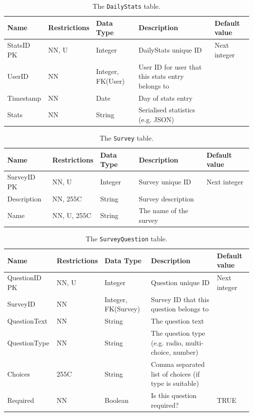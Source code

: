 \documentclass[a4paper, 11pt, titlepage]{article}
\begin{document}
\begin{table}[H]
  \centering
  \caption{The \texttt{DailyStats} table.}
    \begin{tabularx}{\textwidth}{llp{2.5cm}Xl}
    \hline
    Name  & Restrictions & Data Type & Description & Default value \\
    \hline
    StatsID PK & NN, U & Integer & DailyStats unique ID & Next integer \\
    UserID & NN    & Integer, FK(User) & User ID for user that this stats entry belongs to &  \\
    Timestamp & NN    & Date  & Day of stats entry &  \\
    Stats & NN    & String & Serialised statistics (e.g. JSON) &  \\
    \hline
    \end{tabularx}%
  \label{tab:dd:DailyStats}%
\end{table}%


\begin{table}[H]
  \centering
  \caption{The \texttt{Survey} table.}
    \begin{tabularx}{\textwidth}{lllXl}
    \hline
    Name  & Restrictions & Data Type & Description & Default value \\
    \hline
    SurveyID PK & NN, U & Integer & Survey unique ID & Next integer \\
    Description & NN, 255C & String & Survey description &  \\
    Name  & NN, U, 255C & String & The name of the survey &  \\
    \hline
    \end{tabularx}%
  \label{tab:dd:Survey}%
\end{table}%


\begin{table}[H]
  \centering
  \caption{The \texttt{SurveyQuestion} table.}
    \begin{tabularx}{\textwidth}{llp{2.5cm}Xl}
    \hline
    Name  & Restrictions & Data Type & Description & Default value \\
    \hline
    QuestionID PK & NN, U & Integer & Question unique ID & Next integer \\
    SurveyID & NN    & Integer, FK(Survey) & Survey ID that this question belongs to &  \\
    QuestionText & NN    & String & The question text &  \\
    QuestionType & NN    & String & The question type (e.g. radio, multi-choice, number) &  \\
    Choices & 255C  & String & Comma separated list of choices (if type is suitable) &  \\
    Required & NN    & Boolean & Is this question required? & TRUE \\
    \hline
    \end{tabularx}%
  \label{tab:dd:SurveyQuestion}%
\end{table}%
\end{document}
